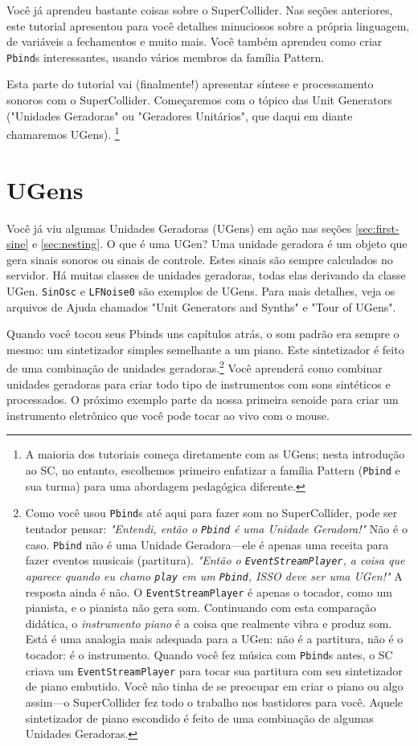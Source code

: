 Você já aprendeu bastante coisas sobre o SuperCollider. Nas seções anteriores, este tutorial apresentou para você detalhes minuciosos sobre a própria linguagem, de variáveis a fechamentos e muito mais. Você também aprendeu como criar \texttt{Pbind}s interessantes, usando vários membros da família Pattern.

Esta parte do tutorial vai (finalmente!) apresentar síntese e processamento sonoros com o SuperCollider. Começaremos com o tópico das Unit Generators ("Unidades Geradoras" ou "Geradores Unitários", que daqui em diante chamaremos UGens). \footnote{A maioria dos tutoriais começa diretamente com as UGens; nesta introdução ao SC, no entanto, escolhemos primeiro enfatizar a família Pattern (\texttt{Pbind} e sua turma) para uma abordagem pedagógica diferente.}

\section{UGens}

Você já viu algumas Unidades Geradoras (UGens) em ação nas seções \ref{sec:first-sine} e \ref{sec:nesting}. O que é uma UGen? Uma unidade geradora é um objeto que gera sinais sonoros ou sinais de controle. Estes sinais são sempre calculados no servidor. Há muitas classes de unidades geradoras, todas elas derivando da classe UGen. \texttt{SinOsc} e \texttt{LFNoise0} são exemplos de UGens. Para mais detalhes, veja os arquivos de Ajuda chamados "Unit Generators and Synths" e "Tour of UGens". 

Quando você tocou seus Pbinds uns capítulos atrás, o som padrão era sempre o mesmo: um sintetizador simples semelhante a um piano. Este sintetizador é feito de uma combinação de unidades geradoras.\footnote{Como você usou \texttt{Pbind}s até aqui para fazer som no SuperCollider, pode ser tentador pensar: \textit{"Entendi, então o \texttt{Pbind} é uma Unidade Geradora!"} Não é o caso. \texttt{Pbind} não é uma Unidade Geradora---ele é apenas uma receita para fazer eventos musicais (partitura). \textit{"Então o \texttt{EventStreamPlayer}, a coisa que aparece quando eu chamo \texttt{play} em um \texttt{Pbind}, ISSO deve ser uma UGen!"} A resposta ainda é não. O \texttt{EventStreamPlayer} é apenas o tocador, como um pianista, e o pianista não gera som. Continuando com esta comparação didática, o \emph{instrumento piano} é a coisa que realmente vibra e produz som. Está é uma analogia mais adequada para a UGen: não é a partitura, não é o tocador: é o instrumento. Quando você fez música com \texttt{Pbind}s antes, o SC criava um \texttt{EventStreamPlayer} para tocar sua partitura com seu sintetizador de piano embutido. Você não tinha de se preocupar em criar o piano ou algo assim---o SuperCollider fez todo o trabalho nos bastidores para você. Aquele sintetizador de piano escondido é feito de uma combinação de algumas Unidades Geradoras.} Você aprenderá como combinar unidades geradoras para criar todo tipo de instrumentos com sons sintéticos e processados. O próximo exemplo parte da nossa primeira senoide para criar um instrumento eletrônico que você pode tocar ao vivo com o mouse.

